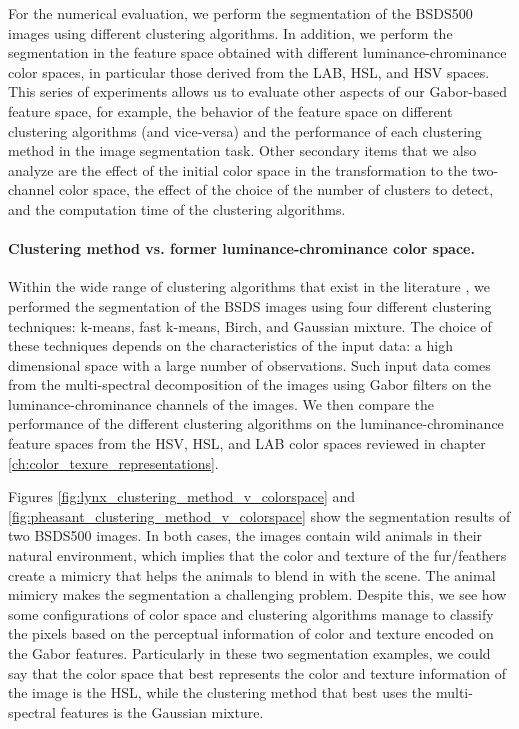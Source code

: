 For the numerical evaluation, we perform the segmentation of the BSDS500 images using different clustering algorithms. In addition, we perform the segmentation in the feature space obtained with different luminance-chrominance color spaces, in particular those derived from the LAB, HSL, and HSV spaces. This series of experiments allows us to evaluate other aspects of our Gabor-based feature space, for example, the behavior of the feature space on different clustering algorithms (and vice-versa) and the performance of each clustering method in the image segmentation task. Other secondary items that we also analyze are the effect of the initial color space in the transformation to the two-channel color space, the effect of the choice of the number of clusters to detect, and the computation time of the clustering algorithms. 

\paragraph{Clustering method vs. former luminance-chrominance color space.} 

Within the wide range of clustering algorithms that exist in the literature \citep{Omran.Engelbrecht.ea:IOS:2007} \citep{Sathya.Manavalan:IJCA:2011}, we performed the segmentation of the BSDS images using four different clustering techniques: k-means, fast k-means, Birch, and Gaussian mixture. The choice of these techniques depends on the characteristics of the input data: a high dimensional space with a large number of observations. Such input data comes from the multi-spectral decomposition of the images using Gabor filters on the luminance-chrominance channels of the images. We then compare the performance of the different clustering algorithms on the luminance-chrominance feature spaces from the HSV, HSL, and LAB color spaces reviewed in chapter \ref{ch:color_texure_representations}. 

Figures \ref{fig:lynx_clustering_method_v_colorspace} and \ref{fig:pheasant_clustering_method_v_colorspace} show the segmentation results of two BSDS500 images. In both cases, the images contain wild animals in their natural environment, which implies that the color and texture of the fur/feathers create a mimicry that helps the animals to blend in with the scene. The animal mimicry makes the segmentation a challenging problem. Despite this, we see how some configurations of color space and clustering algorithms manage to classify the pixels based on the perceptual information of color and texture encoded on the Gabor features. Particularly in these two segmentation examples, we could say that the color space that best represents the color and texture information of the image is the HSL, while the clustering method that best uses the multi-spectral features is the Gaussian mixture. 

